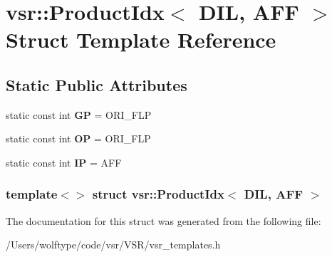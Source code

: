 \hypertarget{structvsr_1_1_product_idx_3_01_d_i_l_00_01_a_f_f_01_4}{\section{vsr\-:\-:Product\-Idx$<$ D\-I\-L, A\-F\-F $>$ Struct Template Reference}
\label{structvsr_1_1_product_idx_3_01_d_i_l_00_01_a_f_f_01_4}
}
\subsection*{Static Public Attributes}
\begin{DoxyCompactItemize}
\item 
\hypertarget{structvsr_1_1_product_idx_3_01_d_i_l_00_01_a_f_f_01_4_ad8a91c6b5ffe2bb5704d3b890d7b57cc}{static const int {\bfseries G\-P} = O\-R\-I\-\_\-\-F\-L\-P}\label{structvsr_1_1_product_idx_3_01_d_i_l_00_01_a_f_f_01_4_ad8a91c6b5ffe2bb5704d3b890d7b57cc}

\item 
\hypertarget{structvsr_1_1_product_idx_3_01_d_i_l_00_01_a_f_f_01_4_afad1ae5a18bc5d3c4f279f4d38606915}{static const int {\bfseries O\-P} = O\-R\-I\-\_\-\-F\-L\-P}\label{structvsr_1_1_product_idx_3_01_d_i_l_00_01_a_f_f_01_4_afad1ae5a18bc5d3c4f279f4d38606915}

\item 
\hypertarget{structvsr_1_1_product_idx_3_01_d_i_l_00_01_a_f_f_01_4_af38df5267b28fe15373b04a4baa0c693}{static const int {\bfseries I\-P} = A\-F\-F}\label{structvsr_1_1_product_idx_3_01_d_i_l_00_01_a_f_f_01_4_af38df5267b28fe15373b04a4baa0c693}

\end{DoxyCompactItemize}
\subsubsection*{template$<$$>$ struct vsr\-::\-Product\-Idx$<$ D\-I\-L, A\-F\-F $>$}



The documentation for this struct was generated from the following file\-:\begin{DoxyCompactItemize}
\item 
/\-Users/wolftype/code/vsr/\-V\-S\-R/vsr\-\_\-templates.\-h\end{DoxyCompactItemize}
